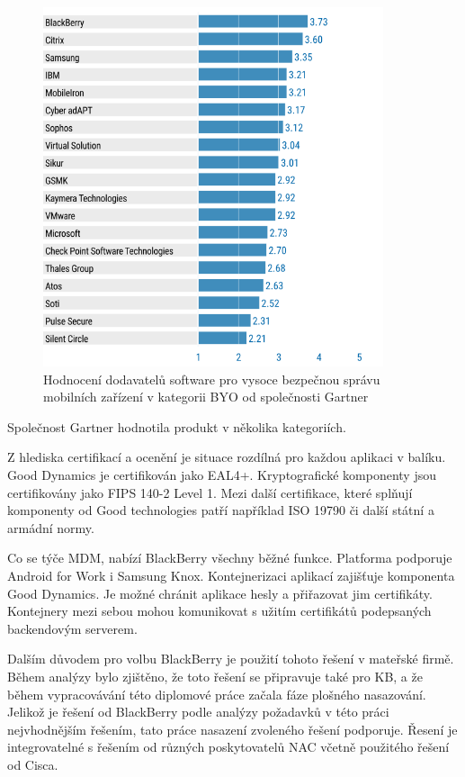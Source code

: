 \begin{figure}[h!]\label{GartnerBB}
\centering
\includegraphics[width=10cm]{img/GartnerBB}
\caption{Hodnocení dodavatelů software pro vysoce bezpečnou správu mobilních zařízení v kategorii BYO od společnosti Gartner}
\end{figure} 

Společnost Gartner hodnotila produkt v několika kategoriích. 

Z hlediska certifikací a ocenění je situace rozdílná pro každou aplikaci v balíku. Good Dynamics je certifikován jako EAL4+. Kryptografické komponenty jsou certifikovány jako FIPS 140-2 Level 1. Mezi další certifikace, které splňují komponenty od Good technologies patří například ISO 19790 či další státní a armádní normy.

Co se týče MDM, nabízí BlackBerry všechny běžné funkce. Platforma podporuje Android for Work i Samsung Knox. Kontejnerizaci aplikací zajišťuje komponenta Good Dynamics. Je možné chránit aplikace hesly a přiřazovat jim certifikáty. Kontejnery mezi sebou mohou komunikovat s užitím certifikátů podepsaných backendovým serverem. 


Dalším důvodem pro volbu BlackBerry je použití tohoto řešení v mateřské firmě. Během analýzy bylo zjištěno, že toto řešení se připravuje také pro KB, a že během vypracovávání této diplomové práce začala fáze plošného nasazování. Jelikož je řešení od BlackBerry podle analýzy požadavků v této práci nejvhodnějším řešením, tato práce nasazení zvoleného řešení podporuje. Řesení je integrovatelné s řešením od různých poskytovatelů NAC včetně použitého řešení od Cisca.    

